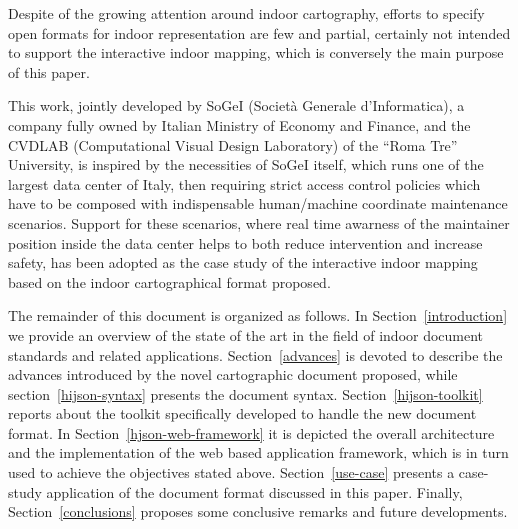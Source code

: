 Despite of the growing attention around indoor cartography, efforts to specify open formats for indoor representation are few and partial, certainly not intended to support the interactive indoor mapping, which is conversely the main purpose of this paper. 

This work, jointly developed by {SoGeI} ({So}ciet\`a {Ge}nerale d'{I}nformatica), a company fully owned by Italian  Ministry of Economy and Finance, and the {CVDLAB} (Computational Visual Design Laboratory) of the ``Roma Tre'' University, is inspired by the necessities of SoGeI itself, which runs one of the largest data center of Italy, then requiring strict access control policies which have to be composed with indispensable human/machine coordinate maintenance scenarios. Support for these scenarios, where real time awarness of the maintainer position inside the data center helps to both reduce intervention and increase safety, has been adopted as the case study of the interactive indoor mapping based on the indoor cartographical format proposed.


The remainder of this document is organized as follows. In Section~\ref{introduction} we
provide an overview of the state of the art in the field of indoor document
standards and related applications. Section~\ref{advances} is devoted to describe the
advances introduced by the novel cartographic document proposed, while section~\ref{hijson-syntax} presents the document syntax. Section~\ref{hijson-toolkit} reports about the toolkit
specifically developed to handle the new document format. In Section~\ref{hjson-web-framework} it is
depicted the overall architecture and the implementation of the web based
application framework, which is in turn used to achieve the objectives stated above. Section~\ref{use-case} presents a case-study application of the document format discussed in this paper.
Finally, Section~\ref{conclusions} proposes some conclusive remarks and future developments.




